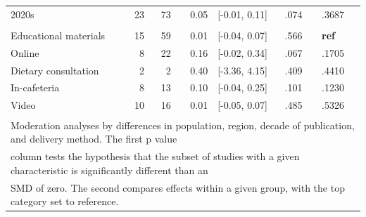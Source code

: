 \documentclass[sn-nature,referee,pdflatex]{sn-jnl}
\begin{document}
\begin{table}[!h]
\begin{tabular}[t]{lrrrlll}
\hspace{1em}2020s & 23 & 73 & 0.05 & {}[-0.01, 0.11] & .074 & .3687\\
\addlinespace[0.3em]
\multicolumn{7}{l}{\textbf{Method of Delivery}}\\
\hspace{1em}Educational materials & 15 & 59 & 0.01 & {}[-0.04, 0.07] & .566 & \textbf{ref}\\
\hspace{1em}Online & 8 & 22 & 0.16 & {}[-0.02, 0.34] & .067 & .1705\\
\hspace{1em}Dietary consultation & 2 & 2 & 0.40 & {}[-3.36, 4.15] & .409 & .4410\\
\hspace{1em}In-cafeteria & 8 & 13 & 0.10 & {}[-0.04, 0.25] & .101 & .1230\\
\hspace{1em}Video & 10 & 16 & 0.01 & {}[-0.05, 0.07] & .485 & .5326\\
\bottomrule
\multicolumn{7}{l}{\textsuperscript{} Moderation analyses by differences in population, region, decade of publication, and delivery method. The first p value}\\
\multicolumn{7}{l}{column tests the hypothesis that the subset of studies with a given characteristic is significantly different than an}\\
\multicolumn{7}{l}{SMD of zero. The second compares effects within a given group, with the top category set to reference.}\\
\end{tabular}
\end{table}
\end{document}
